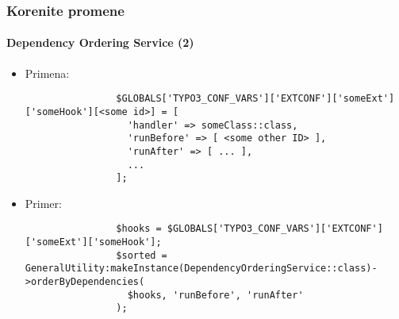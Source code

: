\begin{frame}[fragile]
	\frametitle{Korenite promene}
	\framesubtitle{Dependency Ordering Service (2)}

	\lstset{basicstyle=\tiny\ttfamily}

	\begin{itemize}

		\item Primena:

			\begin{lstlisting}
				$GLOBALS['TYPO3_CONF_VARS']['EXTCONF']['someExt']['someHook'][<some id>] = [
				  'handler' => someClass::class,
				  'runBefore' => [ <some other ID> ],
				  'runAfter' => [ ... ],
				  ...
				];
			\end{lstlisting}

		\item Primer:

			\begin{lstlisting}
				$hooks = $GLOBALS['TYPO3_CONF_VARS']['EXTCONF']['someExt']['someHook'];
				$sorted = GeneralUtility:makeInstance(DependencyOrderingService::class)->orderByDependencies(
				  $hooks, 'runBefore', 'runAfter'
				);
			\end{lstlisting}

	\end{itemize}

\end{frame}


